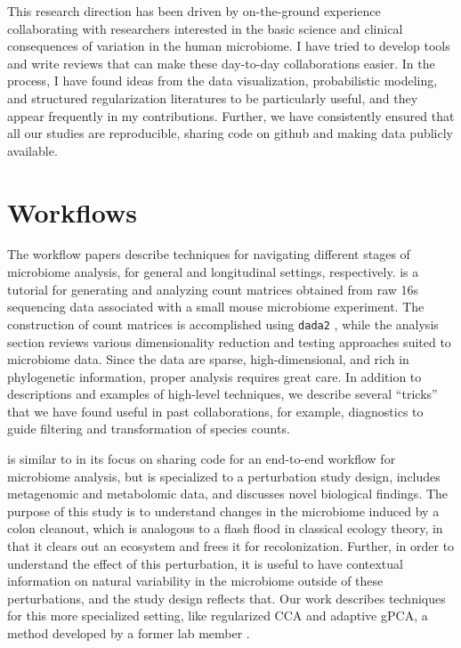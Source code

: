\documentclass{article}
\begin{document}
This research direction has been driven by on-the-ground experience
collaborating with researchers interested in the basic science and clinical
consequences of variation in the human microbiome. I have tried to develop tools
and write reviews that can make these day-to-day collaborations easier. In the
process, I have found ideas from the data visualization, probabilistic modeling,
and structured regularization literatures to be particularly useful, and they
appear frequently in my contributions. Further, we have consistently ensured
that all our studies are reproducible, sharing code on github and making data
publicly available.

\section{Workflows}

The workflow papers \citep{Callahan2016, Fukuyama2017} describe techniques for
navigating different stages of microbiome analysis, for general and longitudinal
settings, respectively. \cite{Callahan2016} is a tutorial for generating and
analyzing count matrices obtained from raw 16s sequencing data associated with a
small mouse microbiome experiment. The construction of count matrices is
accomplished using \texttt{dada2} \citep{callahan2016dada2}, while the analysis
section reviews various dimensionality reduction and testing approaches suited
to microbiome data. Since the data are sparse, high-dimensional, and rich in
phylogenetic information, proper analysis requires great care. In addition to
descriptions and examples of high-level techniques, we describe several
``tricks'' that we have found useful in past collaborations, for example,
diagnostics to guide filtering and transformation of species counts.

\cite{Fukuyama2017} is similar to \cite{Callahan2016} in its focus on sharing
code for an end-to-end workflow for microbiome analysis, but is specialized to a
perturbation study design, includes metagenomic and metabolomic data, and
discusses novel biological findings. The purpose of this study is to understand
changes in the microbiome induced by a colon cleanout, which is analogous to a
flash flood in classical ecology theory, in that it clears out an ecosystem and
frees it for recolonization. Further, in order to understand the effect of this
perturbation, it is useful to have contextual information on natural variability
in the microbiome outside of these perturbations, and the study design reflects
that. Our work describes techniques for this more specialized setting, like
regularized CCA and adaptive gPCA, a method developed by a former lab member
\citep{fukuyama2017adaptive}.
\end{document}
